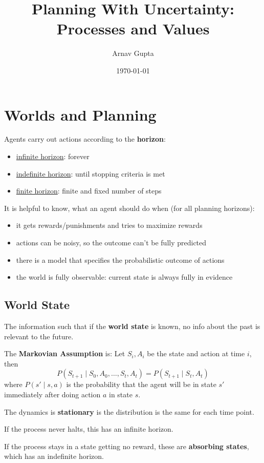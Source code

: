 \documentclass[11pt]{article}
\author{Arnav Gupta}
\date{\today}
\title{Planning With Uncertainty: Processes and Values}
\begin{document}
\maketitle
\tableofcontents

\section{Worlds and Planning}
\label{sec:org52ea593}
Agents carry out actions according to the \textbf{horizon}:
\begin{itemize}
\item \uline{infinite horizon}: forever
\item \uline{indefinite horizon}: until stopping criteria is met
\item \uline{finite horizon}: finite and fixed number of steps
\end{itemize}

It is helpful to know, what an agent should do when (for all planning horizons):
\begin{itemize}
\item it gets rewards/punishments and tries to maximize rewards
\item actions can be noisy, so the outcome can't be fully predicted
\item there is a model that specifies the probabilistic outcome of actions
\item the world is fully observable: current state is always fully in evidence
\end{itemize}
\subsection{World State}
\label{sec:org8769aab}
The information such that if the \textbf{world state} is known, no info about
the past is relevant to the future.

The \textbf{Markovian Assumption} is: Let \(S_{i}, A_{i}\) be the state and action at
time \(i\), then
$$ P(S_{t+1} \mid S_{0}, A_{0}, \dots, S_{t}, A_{t}) = P(S_{t+1} \mid S_{t}, A_{t}) $$
where \(P(s' \mid s, a)\) is the probability that the agent will be in state \(s'\)
immediately after doing action \(a\) in state \(s\).

The dynamics is \textbf{stationary} is the distribution is the same for each time point.

If the process never halts, this has an infinite horizon.

If the process stays in a state getting no reward, these are \textbf{absorbing states},
which has an indefinite horizon.
\end{document}
